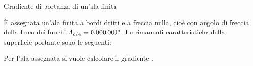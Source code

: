 \documentclass[[12pt,twoside]{book}
\begin{document}
%
\begin{myExampleX}{Gradiente di portanza di un'ala finita}{}%
\label{example:Lift:Gradient:Of:A:Finite:Wing}
%

%
\noindent
È assegnata un'ala finita a bordi dritti e a freccia nulla, cioè con angolo di freccia della linea 
dei fuochi $\Lambda_{c/4}=\SI[round-precision=0]{\mySweepQuarterChordWingDEG}{\degree}$.
Le rimanenti caratteristiche della superficie portante sono le seguenti:

\smallskip
\noindent
{}

\smallskip
\noindent
{}

\smallskip
\noindent
{}

\smallskip
Per l'ala assegnata si vuole calcolare il gradiente .


\end{myExampleX}
\end{document}
